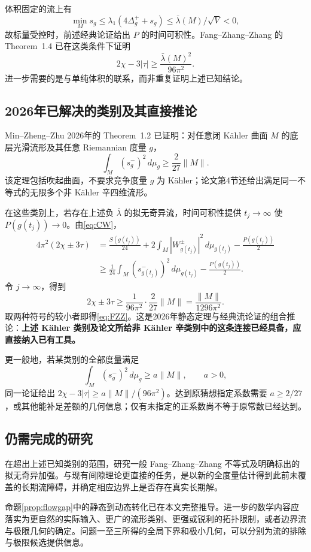 \documentclass[11pt,a4paper]{article}
\newcommand{\dd}{\,d\mu_g}
\newcommand{\Ka}{K{\latin\"a}hler}
\theoremstyle{definition}
\numberwithin{equation}{section}
\begin{document}
体积固定的流上有
\[
\min_Ms_g\le\lambda_1(4\Delta_g^++s_g)
\le\bar\lambda(M)/\sqrt V<0,
\]
故标量受控时，前述经典论证给出 $P$ 的时间可积性。Fang--Zhang--Zhang 的 Theorem~1.4 已在这类条件下证明
\[
2\chi-3|\tau|\ge\frac{\bar\lambda(M)^2}{96\pi^2}.
\]
进一步需要的是与单纯体积的联系，而非重复证明上述已知结论。

\subsection{2026年已解决的类别及其直接推论}
Min--Zheng--Zhu 2026年的 Theorem~1.2 已证明：对任意闭 \Ka{} 曲面 $M$ 的底层光滑流形及其任意 Riemannian 度量 $g$，
\begin{equation}
\boxed{\int_M(s_g^-)^2\dd\ge\frac{2}{27}\|M\|.}\label{eq:scalarvolume}
\end{equation}
该定理包括吹起曲面，不要求竞争度量 $g$ 为 \Ka{}；论文第4节还给出满足同一不等式的无限多个非 \Ka{} 辛四维流形\cite{MinZhengZhu2026}。

在这些类别上，若存在上述负 $\bar\lambda$ 的拟无奇异流，时间可积性提供 $t_j\to\infty$ 使 $P(g(t_j))\to0$。由\eqref{eq:CW}，
\begin{align*}
4\pi^2(2\chi\pm3\tau)
&=\frac{S(g(t_j))}{24}
 +2\int_M|W_{g(t_j)}^\pm|^2\,d\mu_{g(t_j)}-\frac{P(g(t_j))}{2}\\
&\ge\frac1{24}\int_M(s_{g(t_j)}^-)^2\,d\mu_{g(t_j)}-\frac{P(g(t_j))}{2}.
\end{align*}
令 $j\to\infty$，得到
\[
2\chi\pm3\tau\ge\frac{1}{96\pi^2}\cdot\frac{2}{27}\|M\|
=\frac{\|M\|}{1296\pi^2}.
\]
取两种符号的较小者即得\eqref{eq:FZZ}。这是2026年静态定理与经典流论证的组合推论：\textbf{上述 \Ka{} 类别及论文所给非 \Ka{} 辛类别中的这条连接已经具备，应直接纳入已有工具。}

更一般地，若某类别的全部度量满足
\[
\int_M(s_g^-)^2\dd\ge a\|M\|,\qquad a>0,
\]
同一论证给出 $2\chi-3|\tau|\ge a\|M\|/(96\pi^2)$。达到原猜想指定系数需要 $a\ge2/27$，或其他能补足差额的几何信息；仅有未指定的正系数尚不等于原常数已经达到。

\subsection{仍需完成的研究}
在超出上述已知类别的范围，研究一般 Fang--Zhang--Zhang 不等式及明确标出的拟无奇异加强。与现有间隙理论更直接的任务，是以新的全度量估计得到此前未覆盖的长期流障碍，并确定相应边界上是否存在真实长期解。

命题\ref{prop:flowgap}中的静态到动态转化已在本文完整推导。进一步的数学内容应落实为更自然的实际输入、更广的流形类别、更强或锐利的拓扑限制，或者边界流与极限几何的确定。问题一至三所得的全局下界和极小几何，可以分别为流的排除与极限候选提供信息。
\end{document}
